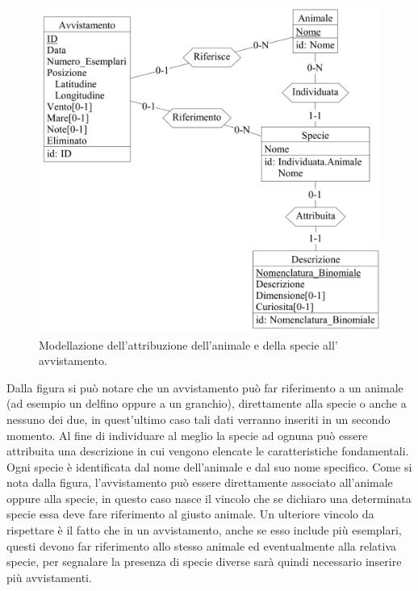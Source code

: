 \documentclass[a4paper,final,12pt]{report}
\begin{document}
\begin{figure}[hbtp]
\centering
\includegraphics[scale=0.10]{img_concettuale/avvistamento2.png}
\caption{Modellazione dell'attribuzione dell'animale e della specie all' avvistamento.}
\end{figure}

Dalla figura si può notare che un avvistamento può far riferimento a un animale (ad esempio un delfino oppure a un granchio), direttamente alla specie o anche a nessuno dei due, in quest'ultimo caso tali dati verranno inseriti in un secondo momento. Al fine di individuare al meglio la specie ad ognuna può essere attribuita una descrizione in cui vengono elencate le caratteristiche fondamentali. Ogni specie è identificata dal nome dell'animale e dal suo nome specifico. Come si nota dalla figura, l'avvistamento può essere direttamente associato all'animale oppure alla specie, in questo caso nasce il vincolo che se dichiaro una determinata specie essa deve fare riferimento al giusto animale. Un ulteriore vincolo da rispettare è il fatto che in un avvistamento, anche se esso include più esemplari, questi devono far riferimento allo stesso animale ed eventualmente alla relativa specie, per segnalare la presenza di specie diverse sarà quindi necessario inserire più avvistamenti.
\end{document}
